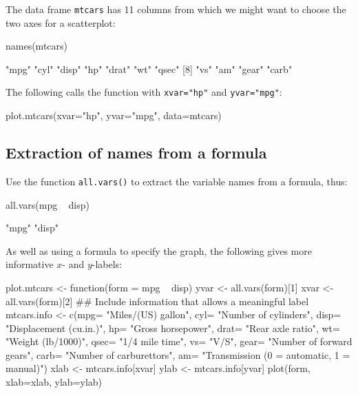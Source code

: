 \documentclass{tufte-book}\usepackage[]{graphicx}\usepackage[]{color}
\newcommand{\txtt}[1]{\texttt{#1}}
\begin{document}
The data frame \txtt{mtcars} has 11 columns from which we might want
to choose the two axes for a scatterplot:
\begin{Schunk}
\begin{Sinput}
names(mtcars)
\end{Sinput}
\begin{Soutput}
 [1] "mpg"  "cyl"  "disp" "hp"   "drat" "wt"   "qsec"
 [8] "vs"   "am"   "gear" "carb"
\end{Soutput}
\end{Schunk}

The following calls the function with \txtt{xvar="hp"} and
\txtt{yvar="mpg"}:
\begin{Schunk}
\begin{Sinput}
plot.mtcars(xvar="hp", yvar="mpg", data=mtcars)
\end{Sinput}
\end{Schunk}

\subsection{Extraction of names from a formula}

Use the function \txtt{all.vars()} to extract the variable names from
a formula, thus:
\begin{Schunk}
\begin{Sinput}
all.vars(mpg ~ disp)
\end{Sinput}
\begin{Soutput}
[1] "mpg"  "disp"
\end{Soutput}
\end{Schunk}

As well as using a formula to specify the graph, the following gives
more informative $x$- and $y$-labels:
\begin{fullwidth}
\begin{Schunk}
\begin{Sinput}
plot.mtcars <- function(form = mpg ~ disp){
   yvar <- all.vars(form)[1]
   xvar <- all.vars(form)[2]
   ## Include information that allows a meaningful label
   mtcars.info <-
     c(mpg= "Miles/(US) gallon",        cyl= "Number of cylinders",
       disp= "Displacement (cu.in.)",   hp= "Gross horsepower",
       drat= "Rear axle ratio",         wt= "Weight (lb/1000)",
       qsec= "1/4 mile time",           vs= "V/S",
       gear= "Number of forward gears",
       carb= "Number of carburettors",
       am= "Transmission (0 = automatic, 1 = manual)")
   xlab <- mtcars.info[xvar]
   ylab <- mtcars.info[yvar]
   plot(form, xlab=xlab, ylab=ylab)
}
\end{Sinput}
\end{Schunk}
\end{fullwidth}
\end{document}
